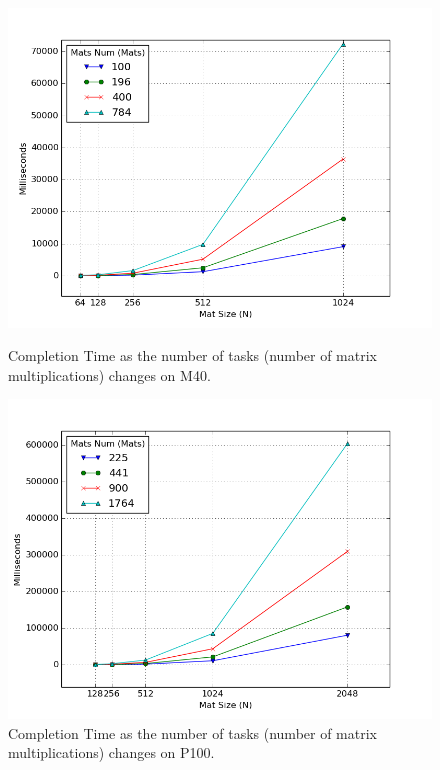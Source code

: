 \begin{figure}
	\centering
	\vspace{-2.4cm}
	\includegraphics[scale=0.7]{plots/mat_comp_numvar.png}
	\caption{Completion Time as the number of tasks (number of matrix multiplications) changes on M40.}
	\label{fig:matcompnumM40}
	 \vspace*{-0.2cm}
	\includegraphics[scale=0.7]{plots/mat_comp_numvar_P100.png}
	\caption{Completion Time as the number of tasks (number of matrix multiplications) changes on P100.}
	\label{fig:matcompnumP100}
\end{figure} 

